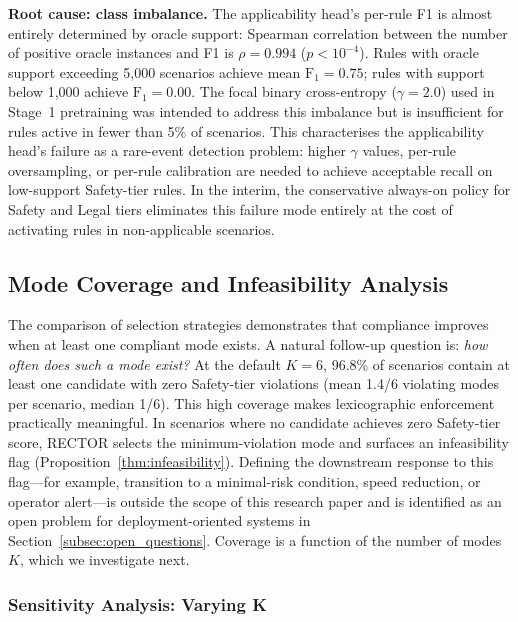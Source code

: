 \noindent\textbf{Root cause: class imbalance.}  The applicability head's per-rule F1 is almost entirely determined by oracle support: Spearman correlation between the number of positive oracle instances and F1 is $\rho{=}0.994$ ($p < 10^{-4}$).  Rules with oracle support exceeding 5{,}000 scenarios achieve mean $\text{F}_1{=}0.75$; rules with support below 1{,}000 achieve $\text{F}_1{=}0.00$.  The focal binary cross-entropy ($\gamma{=}2.0$) used in Stage~1 pretraining was intended to address this imbalance but is insufficient for rules active in fewer than 5\% of scenarios.  This characterises the applicability head's failure as a rare-event detection problem: higher $\gamma$ values, per-rule oversampling, or per-rule calibration are needed to achieve acceptable recall on low-support Safety-tier rules.  In the interim, the conservative always-on policy for Safety and Legal tiers eliminates this failure mode entirely at the cost of activating rules in non-applicable scenarios.

\subsection{Mode Coverage and Infeasibility Analysis}
\label{subsec:mode_coverage}

The comparison of selection strategies demonstrates that compliance improves when at least one compliant mode exists.  A natural follow-up question is: \emph{how often does such a mode exist?}  At the default $K{=}6$, 96.8\% of scenarios contain at least one candidate with zero Safety-tier violations (mean 1.4/6 violating modes per scenario, median 1/6).  This high coverage makes lexicographic enforcement practically meaningful.  In scenarios where no candidate achieves zero Safety-tier score, RECTOR selects the minimum-violation mode and surfaces an infeasibility flag (Proposition~\ref{thm:infeasibility}).  Defining the downstream response to this flag---for example, transition to a minimal-risk condition, speed reduction, or operator alert---is outside the scope of this research paper and is identified as an open problem for deployment-oriented systems in Section~\ref{subsec:open_questions}.  Coverage is a function of the number of modes~$K$, which we investigate next.

\subsubsection{Sensitivity Analysis: Varying K}
\label{subsubsec:k_sensitivity}

